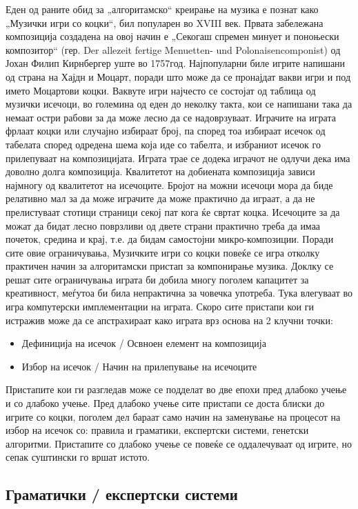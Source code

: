 Еден од раните обид за „алгоритамско“ креирање на музика е познат како „Музички игри со коцки“, бил популарен во XVIII век. Првата забележана композиција создадена на овој начин е „Секогаш спремен минует и поноњески композитор“ (гер. Der allezeit fertige Menuetten- und Polonaisencomponist) од Јохан Филип Кирнбергер уште во 1757год. Најпопуларни биле игрите напишани од страна на Хајдн и Моцарт, поради што може да се пронајдат вакви игри и под името Моцартови коцки. Ваквуте игри најчесто се состојат од таблица од музички исечоци, во големина од еден до неколку такта, кои се напишани така да немаат остри рабови за да може лесно да се надоврзуваат. Играчите на играта фрлаат коцки или случајно избираат број, па според тоа избираат исечок од табелата според одредена шема која иде со табелта, и избраниот исечок го прилепуваат на композицијата. Играта трае се додека играчот не одлучи дека има доволно долга композиција. Квалитетот на добиената композиција зависи најмногу од квалитетот на исечоците. Бројот на можни исечоци мора да биде релативно мал за да може играчите да може практично да играат, а да не прелистуваат стотици страници секој пат кога ќе свртат коцка. Исечоците за да можат да бидат лесно поврзливи од двете страни практично треба да имаа почеток, средина и крај, т.е. да бидам самостојни микро-композиции. Поради сите овие ограничувања, Музичките игри со коцки повеќе се игра отколку практичен начин за алгоритамски пристап за компонирање музика. Доклку се решат сите ограничувања играта би добила многу поголем капацитет за креативност, меѓутоа би била непрактична за човечка употреба. Тука влегуваат во игра компутерски имплементации на играта. Скоро сите пристапи кои ги истражив може да се апстрахираат како играта врз основа на 2 клучни точки:
\begin{itemize}
    \item Дефиниција на исечок / Освноен елемент на композиција 
    \item Избор на исечок / Начин на прилепување на исечоците
\end{itemize}
Пристапите кои ги разгледав може се подделат во две епохи пред длабоко учење и со длабоко учење. Пред длабоко учење сите пристапи се доста блиски до игрите со коцки, поголем дел бараат само начин на заменување на процесот на избор на исечок со: правила и граматики, експертски системи, генетски алгоритми. Пристапите со длабоко учење се повеќе се оддалечуваат од игрите, но сепак суштински го вршат истото. 

\subsection{Граматички / експертски системи} 

